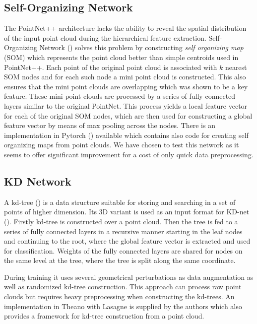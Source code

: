 \subsection{Self-Organizing Network}
The PointNet++ architecture lacks the ability to reveal the spatial distribution of the input point cloud during the hierarchical feature extraction. Self-Organizing Network (\cite{li_so-net:_2018}) solves this problem by constructing \textit{self organizing map} (SOM) which represents the point cloud better than simple centroids used in PointNet++. Each point of the original point cloud is associated with $k$ nearest SOM nodes and for each such node a mini point cloud is constructed. This also ensures that the mini point clouds are overlapping which was shown to be a key feature. These mini point clouds are processed by a series of fully connected layers similar to the original PointNet. This process yields a local feature vector for each of the original SOM nodes, which are then used for constructing a global feature vector by means of max pooling across the nodes. There is an implementation in Pytorch (\cite{li_sonet_2018}) available which contains also code for creating self organizing maps from point clouds. We have chosen to test this network as it seems to offer significant improvement for a cost of only quick data preprocessing.

\subsection{KD Network}
A kd-tree (\cite{bentley_multidimensional_1975}) is a data structure suitable for storing and searching in a set of points of higher dimension. Its 3D variant is used as an input format for KD-net (\cite{klokov_escape_2017}). Firstly kd-tree is constructed over a point cloud. Then the tree is fed to a series of fully connected layers in a recursive manner starting in the leaf nodes and continuing to the root, where the global feature vector is extracted and used for classification. Weights of the fully connected layers are shared for nodes on the same level at the tree, where the tree is split along the same coordinate. \par
During training it uses several geometrical perturbations as data augmentation as well as randomized kd-tree construction. This approach can process raw point clouds but requires heavy preprocessing when constructing the kd-trees.
An implementation in Theano with Lasagne \cite{klokov_kd-net_2017} is supplied by the authors which also provides a framework for kd-tree construction from a point cloud.

